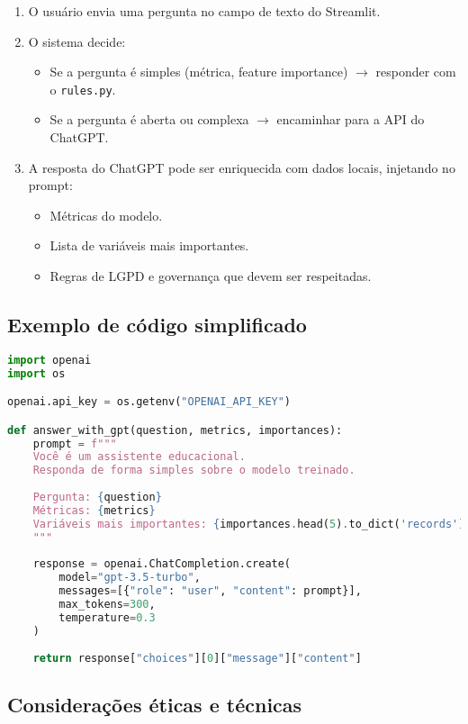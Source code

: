 \documentclass[12pt,a4paper]{article}
\begin{document}
\begin{enumerate}
  \item O usuário envia uma pergunta no campo de texto do Streamlit.
  \item O sistema decide:
    \begin{itemize}
      \item Se a pergunta é simples (métrica, feature importance) $\rightarrow$ responder com o \texttt{rules.py}.
      \item Se a pergunta é aberta ou complexa $\rightarrow$ encaminhar para a API do ChatGPT.
    \end{itemize}
  \item A resposta do ChatGPT pode ser enriquecida com dados locais, injetando no prompt:
    \begin{itemize}
      \item Métricas do modelo.
      \item Lista de variáveis mais importantes.
      \item Regras de LGPD e governança que devem ser respeitadas.
    \end{itemize}
\end{enumerate}

\subsection{Exemplo de código simplificado}

\begin{lstlisting}[language=python]
import openai
import os

openai.api_key = os.getenv("OPENAI_API_KEY")

def answer_with_gpt(question, metrics, importances):
    prompt = f"""
    Você é um assistente educacional.
    Responda de forma simples sobre o modelo treinado.
    
    Pergunta: {question}
    Métricas: {metrics}
    Variáveis mais importantes: {importances.head(5).to_dict('records')}
    """
    
    response = openai.ChatCompletion.create(
        model="gpt-3.5-turbo",
        messages=[{"role": "user", "content": prompt}],
        max_tokens=300,
        temperature=0.3
    )
    
    return response["choices"][0]["message"]["content"]
\end{lstlisting}

\subsection{Considerações éticas e técnicas}
\end{document}
